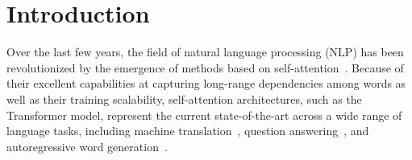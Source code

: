 \documentclass{article}
\begin{document}
\section{Introduction}

Over the last few years, the field of natural language processing (NLP) has been revolutionized by the emergence of methods based on self-attention~\cite{NIPS2017_3f5ee243}. Because of their excellent capabilities at capturing long-range dependencies among words as well as their training scalability, self-attention architectures, such as the Transformer model, represent the current state-of-the-art across a wide range of language tasks, including machine translation~\cite{ott-etal-2018-scaling, chen-etal-2018-best}, question answering~\cite{devlin-etal-2019-bert, dai-etal-2019-transformer}, and autoregressive word generation~\cite{radford2019language, brown2020language}.




\end{document}
